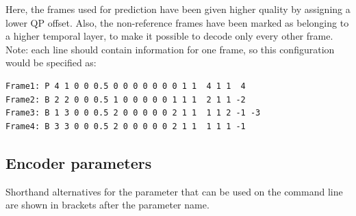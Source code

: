 \documentclass[a4paper,11pt]{jvetdoc}
\begin{document}
Here, the frames used for prediction have been given higher
quality by assigning a lower QP offset. Also, the non-reference
frames have been marked as belonging to a higher temporal layer,
to make it possible to decode only every other frame. Note: each
line should contain information for one frame, so this
configuration would be specified as:

\begin{verbatim}
Frame1: P 4 1 0 0 0.5 0 0 0 0 0 0 0 1 1  4 1 1  4
Frame2: B 2 2 0 0 0.5 1 0 0 0 0 0 1 1 1  2 1 1 -2
Frame3: B 1 3 0 0 0.5 2 0 0 0 0 0 2 1 1  1 1 2 -1 -3
Frame4: B 3 3 0 0 0.5 2 0 0 0 0 0 2 1 1  1 1 1 -1
\end{verbatim}




\subsection{Encoder parameters}

Shorthand alternatives for the parameter that can be used on the command line are shown in brackets after the parameter name.
\end{document}
